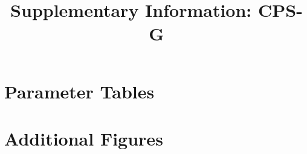 \documentclass[reprint,amsmath,amssymb,aps]{revtex4-2}
\begin{document}
\title{Supplementary Information: CPS-G}
\maketitle

\section{Parameter Tables}

\section{Additional Figures}
\end{document}
